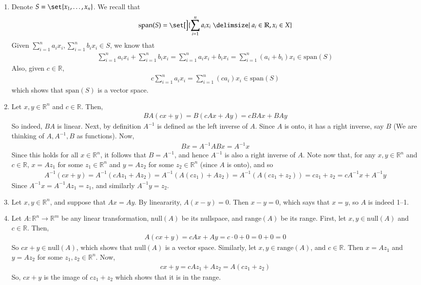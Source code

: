 \documentclass[12pt]{article}
\theoremstyle{definitionstyle}
\def\mbb#1{\mathbb{#1}}
\def \R{\mbb{R}}
\begin{document}
	\begin{enumerate}[leftmargin=\labelsep]
		\item Denote $S = \set{x_1, \ldots, x_n}$. We recall that 
		\begin{align*}
			\mathrm{span}(S) = \set[\Big]{\sum_{i=1}^n {a_ix_i} \given a_i \in \R, x_i \in X}
		\end{align*}
		Given $\sum_{i=1}^n {a_ix_i}, \sum_{i=1}^n {b_ix_i} \in S$, we know that
		\begin{align*}
			\sum_{i=1}^n {a_ix_i} + \sum_{i=1}^n {b_ix_i} = \sum_{i=1}^n a_ix_i + b_ix_i = \sum_{i=1}^n (a_i+b_i)x_i \in \mathrm{span}(S)
		\end{align*}
		Also, given $c \in \R$,
		\begin{align*}
			c\sum_{i=1}^n {a_ix_i} = \sum_{i=1}^n {(ca_i)x_i} \in \mathrm{span}(S)
		\end{align*}
		which shows that $\mathrm{span}(S)$ is a vector space.
		
		\item Let $x, y \in \R^n$ and $c \in \R$. Then,
		\begin{align*}
			BA(cx+y) = B(cAx + Ay) = cBAx + BAy
		\end{align*}
		So indeed, $BA$ is linear. Next, by definition $A^{-1}$ is defined as the left inverse of $A$. Since $A$ is onto, it has a right inverse, say $B$ (We are thinking of $A, A^{-1}, B$ as functions). Now,
		\begin{align*}
			Bx = A^{-1}ABx = A^{-1}x
		\end{align*}
		Since this holds for all $x \in \R^n$, it follows that $B = A^{-1}$, and hence $A^{-1}$ is also a right inverse of $A$. Note now that, for any $x, y \in \R^n$ and $c \in \R$, $x = Az_1$ for some $z_1 \in \R^n$ and $y = Az_2$ for some $z_2 \in \R^n$ (since $A$ is onto), and so
		\begin{align*}
			A^{-1}(cx+y) = A^{-1}(cAz_1 + Az_2) = A^{-1}(A(cz_1) + Az_2) = A^{-1}(A(cz_1 + z_2)) = cz_1 + z_2 = cA^{-1}x + A^{-1}y
		\end{align*}
		Since $A^{-1}x = A^{-1}Az_1 = z_1$, and similarly $A^{-1}y = z_2$.
		
		\item Let $x, y \in \R^n$, and suppose that $Ax = Ay$. By lineararity, $A(x-y) = 0$. Then $x-y = 0$, which says that $x = y$, so $A$ is indeed 1--1.
		
		\item Let $A: \R^n \to \R^m$ be any linear transformation, $\mathrm{null}(A)$ be its nullspace, and $\mathrm{range}(A)$ be its range. First, let $x, y \in \mathrm{null}(A)$ and $c \in \R$. Then,
		\begin{align*}
			A(cx + y) = cAx + Ay = c \cdot 0 + 0 = 0 + 0 = 0
		\end{align*}
		So $cx + y \in \mathrm{null}(A)$, which shows that $\mathrm{null}(A)$ is a vector space. Similarly, let $x, y \in \mathrm{range}(A)$, and $c \in \R$. Then $x = Az_1$ and $y = Az_2$ for some $z_1, z_2 \in \R^n$. Now,
		\begin{align*}
			cx + y = cAz_1 + Az_2 = A(cz_1 + z_2)
		\end{align*}
		So, $cx + y$ is the image of $cz_1 + z_2$ which shows that it is in the range.
		

\end{enumerate}
\end{document}
